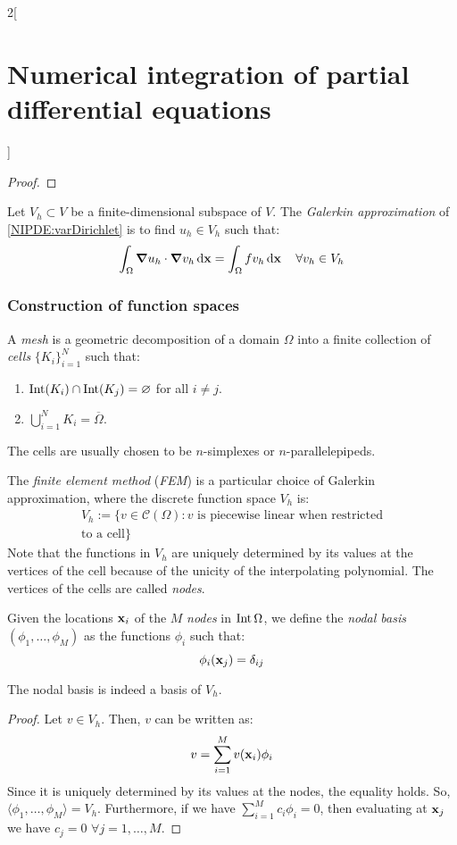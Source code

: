\documentclass[../../../main_math.tex]{subfiles}
\begin{document}
\begin{multicols}{2}[\section{Numerical integration of partial differential equations}]
\begin{proof}
  \end{proof}
  \begin{definition}
    Let $V_h\subset V$ be a finite-dimensional subspace of $V$. The \emph{Galerkin approximation} of \cref{NIPDE:varDirichlet} is to find $u_h\in V_h$ such that:
    \begin{equation}\label{NIPDE:Galerkin}
      \int_\Omega \grad{u_h}\cdot\grad{v_h}\dd{\boldsymbol{\mathrm{x}}}=\int_\Omega fv_h\dd{\boldsymbol{\mathrm{x}}}\quad\forall v_h\in V_h
    \end{equation}
  \end{definition}
  \subsubsection{Construction of function spaces}
  \begin{definition}[Mesh]
    A \emph{mesh} is a geometric decomposition of a domain $\Omega$ into a finite collection of \emph{cells} ${\{K_i\}}_{i=1}^N$ such that:
    \begin{enumerate}
      \item $\operatorname{Int}(K_i) \cap \operatorname{Int}(K_j) = \varnothing$ for all $i\neq j$.
      \item $\bigcup_{i=1}^N K_i = \overline{\Omega}$.
    \end{enumerate}
    The cells are usually chosen to be $n$-simplexes or $n$-parallelepipeds.
  \end{definition}
  \begin{definition}
    The \emph{finite element method} (\emph{FEM}) is a particular choice of Galerkin approximation, where the discrete function space
    $V_h$ is:
    \begin{multline*}
      V_h:=\{v\in\mathcal{C}(\Omega):v\text{ is piecewise linear when restricted}\\\text{to a cell}\}
    \end{multline*}
    Note that the functions in $V_h$ are uniquely determined by its values at the vertices of the cell because of the unicity of the interpolating polynomial. The vertices of the cells are called \emph{nodes}.
  \end{definition}
  \begin{definition}
    Given the locations $\boldsymbol{\mathrm{x}}_i$ of the $M$ \emph{nodes} in $\operatorname{Int}\Omega$, we define the \emph{nodal basis} $(\phi_1,\ldots,\phi_M)$ as the functions $\phi_i$ such that:
    $$\phi_i(\boldsymbol{\mathrm{x}}_j)=\delta_{ij}$$
  \end{definition}
  \begin{lemma}
    The nodal basis is indeed a basis of $V_h$.
  \end{lemma}
  \begin{proof}
    Let $v\in V_h$. Then, $v$ can be written as:
    $$
      v=\sum_{i=1}^M v(\boldsymbol{\mathrm{x}}_i)\phi_i
    $$
    Since it is uniquely determined by its values at the nodes, the equality holds.
    So, $\langle \phi_1, \ldots, \phi_M\rangle=V_h$. Furthermore, if we have $\sum_{i=1}^M c_i\phi_i=0$, then evaluating at $\boldsymbol{\mathrm{x}}_j$ we have $c_j=0$ $\forall j=1,\ldots,M$.
  \end{proof}

\end{multicols}
\end{document}
